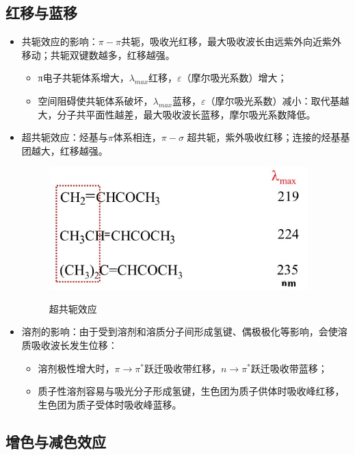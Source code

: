 \subsection{红移与蓝移}
\begin{itemize}
    \item 共轭效应的影响：$\pi -\pi$共轭，吸收光红移，最大吸收波长由远紫外向近紫外移动；共轭双键数越多，红移越强。
    \begin{itemize}
        \item  π电子共轭体系增大，$\lambda_{max}$红移，$\varepsilon$（摩尔吸光系数）增大；
        \item 空间阻碍使共轭体系破坏，$\lambda_{max}$蓝移，$\varepsilon$（摩尔吸光系数）减小：取代基越大，分子共平面性越差，最大吸收波长蓝移，摩尔吸光系数降低。
    \end{itemize}
    \item 超共轭效应：烃基与$\pi$体系相连，$\pi-\sigma$ 超共轭，紫外吸收红移；连接的烃基基团越大，红移越强。
    \begin{figure}[h]
        \centering
        \includegraphics[width=10cm]{image/chp3_ultra.png}
        \label{fig:chp3ultra}
        \caption{超共轭效应}
    \end{figure}
    \item 溶剂的影响：由于受到溶剂和溶质分子间形成氢键、偶极极化等影响，会使溶质吸收波长发生位移：
    \begin{itemize}
        \item 溶剂极性增大时，$\pi \rightarrow \pi^{*}$跃迁吸收带红移，$n\rightarrow \pi^{*}$跃迁吸收带蓝移；
        \item 质子性溶剂容易与吸光分子形成氢键，生色团为质子供体时吸收峰红移，生色团为质子受体时吸收峰蓝移。
    \end{itemize}
\end{itemize}

\subsection{增色与减色效应}

